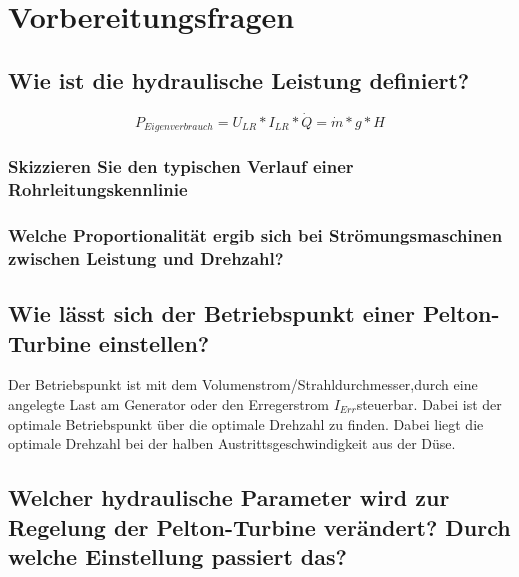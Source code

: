\section{Vorbereitungsfragen}
\subsection{Wie ist die hydraulische Leistung definiert?}
%
\begin{equation}
	P_{ Eigenverbrauch }= U_{ LR} * I_{ LR }* \dot Q = \dot m * g* H
\label{eq:2}
\end{equation}
%
\subsubsection{Skizzieren Sie den typischen Verlauf einer Rohrleitungskennlinie}
\subsubsection{Welche Proportionalität ergib sich bei Strömungsmaschinen zwischen Leistung und Drehzahl?}
\subsection{Wie lässt sich der Betriebspunkt einer Pelton-Turbine einstellen?}
Der Betriebspunkt ist mit dem Volumenstrom/Strahldurchmesser,durch eine angelegte Last am Generator oder den Erregerstrom $I_{Err}$steuerbar. Dabei ist der optimale Betriebspunkt über die optimale Drehzahl zu finden. Dabei liegt die optimale Drehzahl bei der halben Austrittsgeschwindigkeit aus der Düse.

\subsection{Welcher hydraulische Parameter wird zur Regelung der Pelton-Turbine verändert?
Durch welche Einstellung passiert das?}